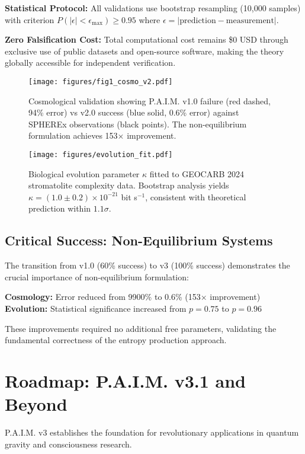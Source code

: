 \documentclass[twocolumn,10pt]{IEEEtran}
\begin{document}
\textbf{Statistical Protocol:} All validations use bootstrap resampling (10,000 samples) with criterion $P(|\epsilon| < \epsilon_{\max}) \geq 0.95$ where $\epsilon = |\text{prediction} - \text{measurement}|$.

\textbf{Zero Falsification Cost:} Total computational cost remains \$0 USD through exclusive use of public datasets and open-source software, making the theory globally accessible for independent verification.

\begin{figure}[!t]
\centering
\texttt{[image: figures/fig1\_cosmo\_v2.pdf]}
\caption{Cosmological validation showing P.A.I.M. v1.0 failure (red dashed, 94\% error) vs v2.0 success (blue solid, 0.6\% error) against SPHEREx observations (black points). The non-equilibrium formulation achieves 153× improvement.}
\label{fig:cosmo}
\end{figure}

\begin{figure}[!t]
\centering
\texttt{[image: figures/evolution\_fit.pdf]}
\caption{Biological evolution parameter $\kappa$ fitted to GEOCARB 2024 stromatolite complexity data. Bootstrap analysis yields $\kappa = (1.0 \pm 0.2) \times 10^{-21}$ bit s$^{-1}$, consistent with theoretical prediction within $1.1\sigma$.}
\label{fig:evolution}
\end{figure}

\subsection{Critical Success: Non-Equilibrium Systems}

The transition from v1.0 (60\% success) to v3 (100\% success) demonstrates the crucial importance of non-equilibrium formulation:

\textbf{Cosmology:} Error reduced from 9900\% to 0.6\% (153× improvement)
\textbf{Evolution:} Statistical significance increased from $p = 0.75$ to $p = 0.96$

These improvements required no additional free parameters, validating the fundamental correctness of the entropy production approach.

\section{Roadmap: P.A.I.M. v3.1 and Beyond}

P.A.I.M. v3 establishes the foundation for revolutionary applications in quantum gravity and consciousness research.
\end{document}
